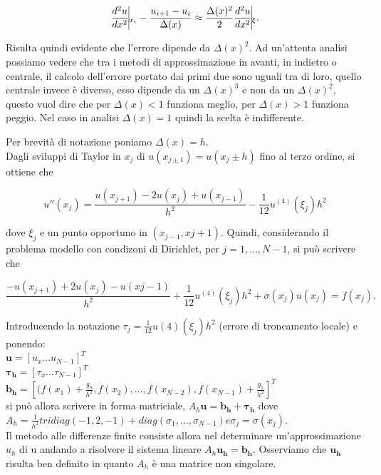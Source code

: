 $$
\frac{d^2u}{dx^2}\vline_{x_i}-\frac{u_{i+1}-u_i}{\Delta(x)}\approx \frac{\Delta(x)^2}{2} \frac{d^2u}{dx^2}\vline_\xi.
$$

Risulta quindi evidente che l'errore dipende da $\Delta(x)^2$. 
Ad un'attenta analisi possiamo vedere che tra i metodi di approssimazione in avanti, in indietro o centrale, il calcolo dell'errore portato dai primi due sono uguali tra di loro, quello centrale invece è diverso, esso dipende da un $\Delta(x)^3$ e non da un $\Delta(x)^2$, questo vuol dire che per $\Delta(x)<1$ funziona meglio, per $\Delta(x)>1$ funziona peggio. Nel caso in analisi $\Delta(x)=1$ quindi la scelta è indifferente.

Per brevità di notazione poniamo $\Delta(x)=h$.\\
Dagli sviluppi di Taylor in $x_j$ di
$u(x_{j \pm 1}) = u(x_j \pm h)$ fino al terzo ordine, si ottiene che

$$
u''(x_j) =\frac{u(x_{j+1}) - 2u(x_j) + u(x_{j-1})}{h^2} -\frac{1}{12} u^{(4)}(\xi_j)h^2
$$

dove $\xi_j$ e un punto opportuno in $(x_{j-1} , x{j+1})$. Quindi, considerando il problema modello con condizoni di Dirichlet, per $j = 1,...,N-1$, si può scrivere che

$$
\frac{-u(x_{j+1}) + 2u(x_j) -u(x{j-1})}{h^2}
 + \frac{1}{12} u^{(4)}(\xi_j)h^2 + \sigma(x_j)u(x_j) = f(x_j) .
$$

Introducendo la notazione $\tau_{j}=\frac{1}{12} u(4)(\xi_j)h^2$ (errore di troncamento locale) e ponendo:\\

$\boldsymbol{u}=[u_x...u_{N-1}]^T$\\
$\boldsymbol{\tau_h}=[\tau_x...\tau_{N-1}]^T$\\
$\boldsymbol{b_h}=[(f(x_1) + \frac{g_0}{h^2},f(x_2),...,f(x_{N-2}),f(x_{N-1}) + \frac{g_1}{h^2}]^T$\\

si può allora scrivere in forma matriciale,
$A_h\boldsymbol{u} = \boldsymbol{b_h} + \boldsymbol{\tau_h}$
dove $A_h = \frac{1}{h^2}
 tridiag(-1,2,-1) + diag(\sigma_1, ... ,\sigma_{N-1}) e \sigma_j = \sigma(x_j)$.\\
\vspace{1em}
Il metodo alle differenze finite consiste allora nel determinare un’approssimazione $u_h$ di
u andando a risolvere il sistema lineare
$A_h\boldsymbol{u_h} = \boldsymbol{b_h}.$
Osserviamo che $\boldsymbol{u_h}$ risulta ben definito in quanto $A_h$ è una matrice non singolare.\\

